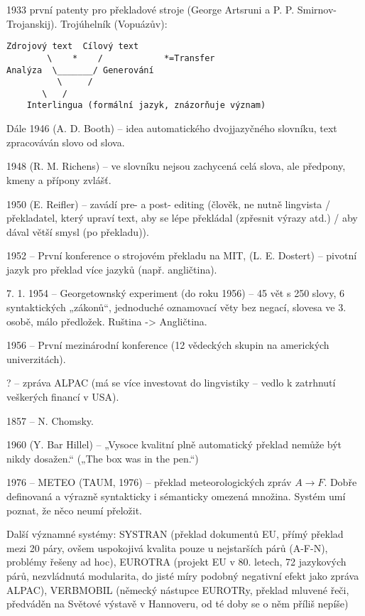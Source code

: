 \documentclass[12pt]{article}					%
\begin{document}
\begin{poznamka}[Prehistorie]
	1933 první patenty pro překladové stroje (George Artsruni a P. P. Smirnov-Trojanskij). Trojúhelník (Vopuázův):
\begin{verbatim}
Zdrojový text  Cílový text
        \    *    /            *=Transfer
Analýza  \_______/ Generování
          \     /
	   \   /
	Interlingua (formální jazyk, znázorňuje význam)
\end{verbatim}

	Dále 1946 (A. D. Booth) – idea automatického dvojjazyčného slovníku, text zpracováván slovo od slova.

	1948 (R. M. Richens) – ve slovníku nejsou zachycená celá slova, ale předpony, kmeny a přípony zvlášť.

	1950 (E. Reifler) – zavádí pre- a post- editing (člověk, ne nutně lingvista / překladatel, který upraví text, aby se lépe překládal (zpřesnit výrazy atd.) / aby dával větší smysl (po překladu)).

	1952 – První konference o strojovém překladu na MIT, (L. E. Dostert) – pivotní jazyk pro překlad více jazyků (např. angličtina).

	7. 1. 1954 – Georgetownský experiment (do roku 1956) – 45 vět s 250 slovy, 6 syntaktických „zákonů“, jednoduché oznamovací věty bez negací, slovesa ve 3. osobě, málo předložek. Ruština -> Angličtina.

	1956 – První mezinárodní konference (12 vědeckých skupin na amerických univerzitách).

	? – zpráva ALPAC (má se více investovat do lingvistiky – vedlo k zatrhnutí veškerých financí v USA).

	1857 – N. Chomsky.

	1960 (Y. Bar Hillel) – „Vysoce kvalitní plně automatický překlad nemůže být nikdy dosažen.“ („The box was in the pen.“)

	1976 – METEO (TAUM, 1976) – překlad meteorologických zpráv $A \to  F$. Dobře definovaná a výrazně syntakticky i sémanticky omezená množina. Systém umí poznat, že něco neumí přeložit.

	Další významné systémy: SYSTRAN (překlad dokumentů EU, přímý překlad mezi 20 páry, ovšem uspokojivá kvalita pouze u nejstarších párů (A-F-N), problémy řešeny ad hoc), EUROTRA (projekt EU v 80. letech, 72 jazykových párů, nezvládnutá modularita, do jisté míry podobný negativní efekt jako zpráva ALPAC), VERBMOBIL (německý nástupce EUROTRy, překlad mluvené řeči, předváděn na Světové výstavě v Hannoveru, od té doby se o něm příliš nepíše)
\end{poznamka}
\end{document}
